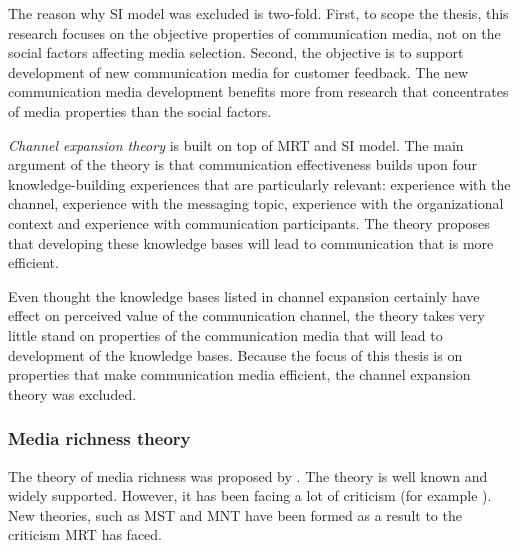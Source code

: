 \documentclass[english,12pt,a4paper,pdftex]{article}
\begin{document}
The reason why \ac{SI} model was excluded is two-fold. First, to scope the thesis, this research focuses on the objective properties of communication media, not on the social factors affecting media selection. Second, the objective is to support development of new communication media for customer feedback. The new communication media development benefits more from research that concentrates of media properties than the social factors.

\emph{Channel expansion theory} is built on top of \ac{MRT} and \ac{SI} model. The main argument of the theory is that communication effectiveness builds upon four knowledge-building experiences that are particularly relevant: experience with the channel, experience with the messaging topic, experience with the organizational context and experience with communication participants. The theory proposes that developing these knowledge bases will lead to communication that is more efficient. \citep{carlson1994} \citep{carlson1999}

Even thought the knowledge bases listed in channel expansion certainly have effect on perceived value of the communication channel, the theory takes very little stand on properties of the communication media that will lead to development of the knowledge bases. Because the focus of this thesis is on properties that make communication media efficient, the channel expansion theory was excluded.

\subsubsection{Media richness theory}

The theory of media richness was proposed by \citet{daft1986}. The theory is well known and widely supported. However, it has been facing a lot of criticism (for example \citep{elshinnawy1997} \citep{dennis1999} \citep{korkala2006}). New theories, such as \ac{MST} and \ac{MNT} have been formed as a result to the criticism \ac{MRT} has faced.
\end{document}
